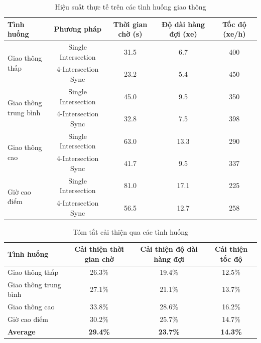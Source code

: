 \begin{table}[!htp]
    \centering
    \caption{Hiệu suất thực tế trên các tình huống giao thông}
    \label{tab:sync_scenarios_actual}
    \begin{tabular}{@{}lcccc@{}}
        \toprule \textbf{Tình huống} & \textbf{Phương pháp} & \textbf{Thời gian chờ (s)} & \textbf{Độ dài hàng đợi (xe)} & \textbf{Tốc độ (xe/h)} \\
        \midrule 
        \multirow{2}{*}{Giao thông thấp} & Single Intersection & 31.5 & 6.7 & 400 \\
        & 4-Intersection Sync & 23.2 & 5.4 & 450 \\
        \midrule
        \multirow{2}{*}{\parbox{2cm}{\centering Giao thông \\ trung bình}} & Single Intersection & 45.0 & 9.5 & 350 \\
        & 4-Intersection Sync & 32.8 & 7.5 & 398 \\
        \midrule
        \multirow{2}{*}{Giao thông cao} & Single Intersection & 63.0 & 13.3 & 290 \\
        & 4-Intersection Sync & 41.7 & 9.5 & 337 \\
        \midrule
        \multirow{2}{*}{Giờ cao điểm} & Single Intersection & 81.0 & 17.1 & 225 \\
        & 4-Intersection Sync & 56.5 & 12.7 & 258 \\
        \bottomrule
    \end{tabular}
\end{table}

\begin{table}[!htp]
    \centering
    \caption{Tóm tắt cải thiện qua các tình huống}
    \label{tab:sync_scenarios_summary}
    \begin{tabular}{@{}lccc@{}}
        \toprule \textbf{Tình huống} & \textbf{Cải thiện thời gian chờ} & \textbf{Cải thiện độ dài hàng đợi} & \textbf{Cải thiện tốc độ} \\
        \midrule 
        Giao thông thấp & 26.3\% & 19.4\% & 12.5\% \\
        Giao thông trung bình & 27.1\% & 21.1\% & 13.7\% \\
        Giao thông cao & 33.8\% & 28.6\% & 16.2\% \\
        Giờ cao điểm & 30.2\% & 25.7\% & 14.7\% \\
        \midrule
        \textbf{Average} & \textbf{29.4\%} & \textbf{23.7\%} & \textbf{14.3\%} \\
        \bottomrule
    \end{tabular}
\end{table}

